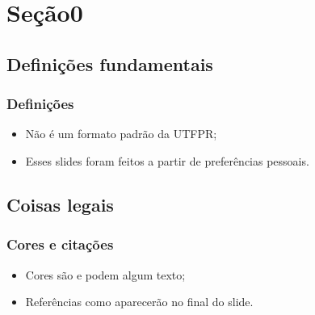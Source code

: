 \section{Seção0}

\subsection{Definições fundamentais}
\begin{frame}
	\frametitle{Definições}

	\begin{itemize}
    	\item Não é um formato padrão da UTFPR;
		\item Esses slides foram feitos a partir de preferências pessoais.
	\end{itemize}
\end{frame}

\subsection{Coisas legais}
\begin{frame}
	\frametitle{Cores e citações}
    
    \begin{itemize}
    	\item Cores são  e podem  algum texto;
        \item Referências como \cite{codebreakers} aparecerão no final do slide.
	\end{itemize}
    
\end{frame}
